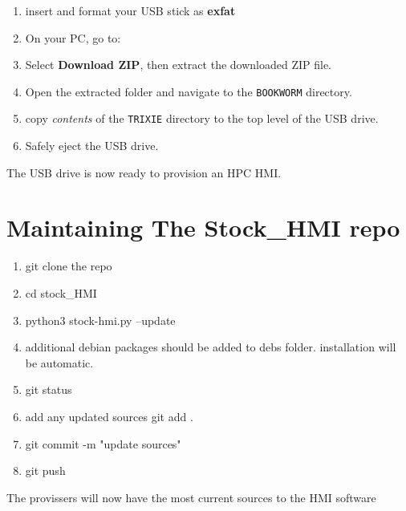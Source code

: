 \documentclass[]{article}
\begin{document}
\begin{enumerate}
	\item insert and format your USB stick as \textbf{exfat}
	\item On your PC, go to:\par
	[
	\url{https://github.com/NyleWaterHeatingSystems/stock_hmi}
	]
	
	\item Select \textbf{Download ZIP}, then extract the downloaded ZIP file.
	
	\item Open the extracted folder and navigate to the \texttt{BOOKWORM} directory.
	
	\item copy \emph{contents} of the \texttt{TRIXIE} directory to the top level of the USB drive.
	
	\item Safely eject the USB drive.
	
\end{enumerate}

The USB drive is now ready to provision an HPC HMI.

\newpage
\section*{Maintaining The Stock\_HMI repo}
\begin{enumerate}
	\item git clone the repo
	\item cd stock\_HMI
	\item python3 stock-hmi.py --update
	
	\item 	additional debian packages should be added to debs folder.
	        installation will be automatic. 
	
	\item git status
	\item add any updated sources git add .
	\item git commit -m "update sources"
	\item git push
	\end{enumerate}

	The provissers will now have the most current sources to the HMI software
\end{document}
